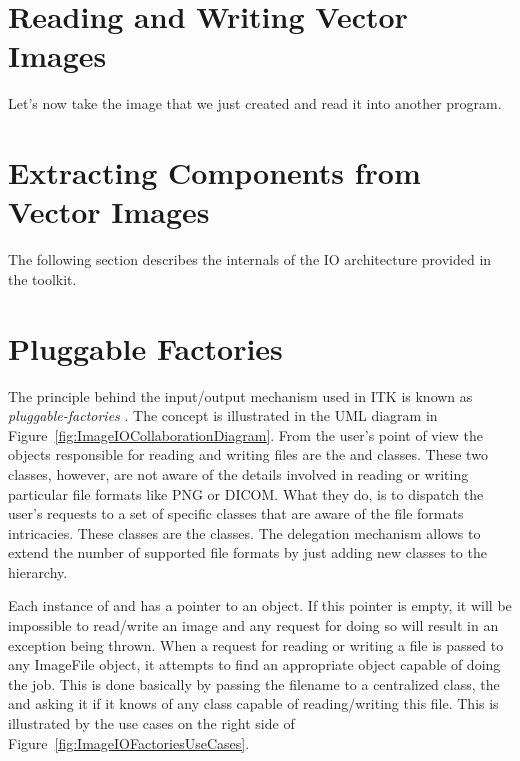 \section{Reading and Writing Vector Images}
\label{sec:VectorImagReadWrite}



Let's now take the image that we just created and read it into another program.




\section{Extracting Components from Vector Images}
\label{sec:VectorImageExtractComponent}




The following section describes the internals of the IO architecture provided
in the toolkit.

\section{Pluggable Factories}
\label{sec:ImageIOPluggableFactories}

The principle behind the input/output mechanism used in ITK is known as
\emph{pluggable-factories} \cite{Gamma1995}. The concept is illustrated in the
UML diagram in Figure~\ref{fig:ImageIOCollaborationDiagram}. From the user's
point of view the objects responsible for reading and writing files are the
 and  classes. These two
classes, however, are not aware of the details involved in reading or writing
particular file formats like PNG or DICOM.  What they do, is to dispatch the
user's requests to a set of specific classes that are aware of the file formats
intricacies. These classes are the  classes. The delegation
mechanism allows to extend the number of supported file formats by just adding
new classes to the  hierarchy.

Each instance of  and  has a
pointer to an  object. If this pointer is empty, it will be
impossible to read/write an image and any request for doing so will result in
an exception being thrown. When a request for reading or writing a file is
passed to any ImageFile object, it attempts to find an appropriate
 object capable of doing the job. This is done basically by
passing the filename to a centralized class, the  and
asking it if it knows of any  class capable of reading/writing
this file. This is illustrated by the use cases on the right side of
Figure~\ref{fig:ImageIOFactoriesUseCases}.

